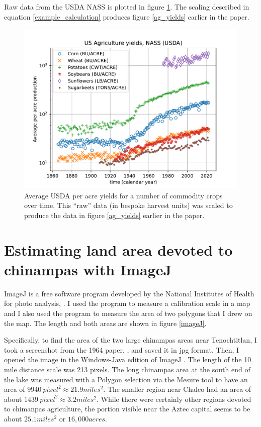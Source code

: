 \documentclass[12pt]{iopart}
\begin{document}
Raw data from the USDA NASS is plotted in figure \ref{raw_production_per_acre}.  The scaling described in equation \ref{example_calculation} produces figure \ref{ag_yields} earlier in the paper.
\begin{figure}[ht!]
\centering
\includegraphics[width=\columnwidth]{raw_production_per_acre.pdf}
\caption{
Average USDA per acre yields for a number of commodity crops over time.  This ``raw'' data (in bespoke harvest units) was scaled to produce the data in figure \ref{ag_yields} earlier in the paper. 
}
\label{raw_production_per_acre}
\end{figure}


\clearpage

\section{Estimating land area devoted to chinampas with ImageJ}
\label{appx_imageJ}

ImageJ is a free software program developed by the National Institutes of Health for photo analysis, \cite{imageJ}.  I used the program to measure a calibration scale in a map and I also used the program to measure the area of two polygons that I drew on the map.  The length and both areas are shown in figure \ref{imageJ}.

Specifically, to find the area of the two large chinampas areas near Tenochtitlan, I took a screenshot from the 1964 paper, \cite{Chinampas_1964}, and saved it in jpg format.  Then, I opened the image in the Windows-Java edition of ImageJ \cite{imageJ}.  The length of the 10 mile distance scale was 213 pixels. The long chinampas area at the south end of the lake was measured with a Polygon selection via the Mesure tool to have an area of $9940~pixel^2\approx21.9miles^2$.  The smaller region near Chalco had an area of about $1439~pixel^2\approx3.2miles^2$.  While there were certainly other regions devoted to chimanpas agriculture, the portion visible near the Aztec capital seems to be about $25.1miles^2$ or $16,000acres$.  
\end{document}
